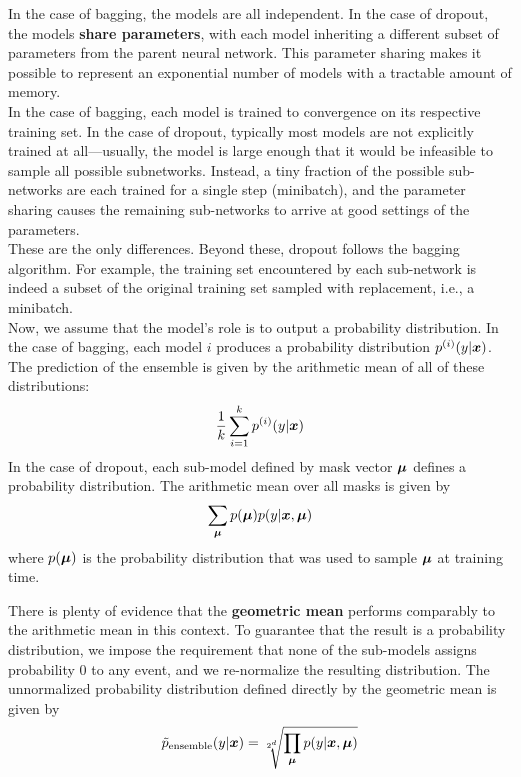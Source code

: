 \begin{multicols}{2}
	In the case of bagging, the models are all independent. In the case of dropout, the models \textbf{share parameters}, with each model inheriting a different subset of parameters from the parent neural network.
	This parameter sharing makes it possible to represent an exponential number of models with a tractable amount of memory.\\

	In the case of bagging, each model is trained to convergence on its respective training set.
	In the case of dropout, typically most models are not explicitly trained at all—usually, the model is large enough that it would be infeasible to sample all possible subnetworks. Instead, a tiny fraction of the possible sub-networks are each trained for a single step (minibatch), and the parameter sharing causes the remaining sub-networks to arrive at good settings of the parameters.\\

	These are the only differences. Beyond these, dropout follows the bagging algorithm. For example, the training set encountered by each sub-network is indeed a subset of the original training set sampled with replacement, i.e., a minibatch.\\

	Now, we assume that the model's role is to output a probability distribution.
	In the case of bagging, each model $i$ produces a probability distribution $ p^{(i)}(y|{\bm{x}}) $.
	The prediction of the ensemble is given by the arithmetic mean of all of these distributions:
	\[ \frac{1}{k}\sum_{i=1}^{k}p^{(i)}(y|{\bm{x}}) \]
	In the case of dropout, each sub-model defined by mask vector ${\bm{\mu}}$ defines a probability distribution.
	The arithmetic mean over all masks is given by
	\[ \sum_{\bm{\mu}} p({\bm{\mu}})p(y|{\bm{x}},{\bm{\mu}}) \]
	where $p({\bm{\mu}})$ is the probability distribution that was used to sample ${\bm{\mu}}$ at training time.

	There is plenty of evidence that the \textbf{geometric mean} performs comparably to the arithmetic mean in this context.
	To guarantee that the result is a probability distribution, we impose the requirement that none of the sub-models assigns probability 0 to any event, and we re-normalize the resulting distribution.
	The unnormalized probability distribution defined directly by the geometric mean is given by
	\[ \tilde{p}_{\text{ensemble}}(y|{\bm{x}}) = \sqrt[2^d]{\prod_{\bm{\mu}} p(y|{\bm{x}},{\bm{\mu}})} \]


\end{multicols}
